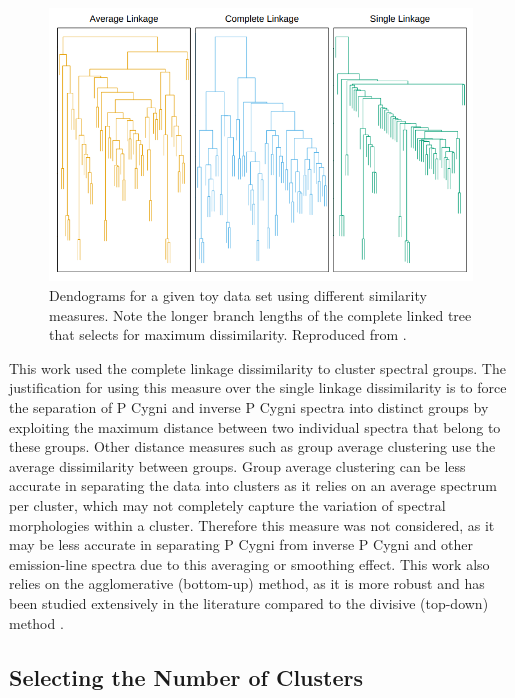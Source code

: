 \begin{figure}[!htb]
\centering
\includegraphics[scale=0.60]{figures/complete linkage.png}
\caption{Dendograms for a given toy data set using different similarity measures. Note the longer branch lengths of the complete linked tree that selects for maximum dissimilarity. Reproduced from \citet{hastie2009elements}.}
\end{figure}

This work used the complete linkage dissimilarity to cluster spectral groups. The justification for using this measure over the single linkage dissimilarity is to force the separation of P Cygni and inverse P Cygni spectra into distinct groups by exploiting the maximum distance between two individual spectra that belong to these groups. Other distance measures such as group average clustering use the average dissimilarity between groups. Group average clustering can be less accurate in separating the data into clusters as it relies on an average spectrum per cluster, which may not completely capture the variation of spectral morphologies within a cluster. Therefore this measure was not considered, as it may be less accurate in separating P Cygni from inverse P Cygni and other emission-line spectra due to this averaging or smoothing effect. This work also relies on the agglomerative (bottom-up) method, as it is more robust and has been studied extensively in the literature compared to the divisive (top-down) method \citep{hastie2009elements}.

\subsection{Selecting the Number of Clusters}

